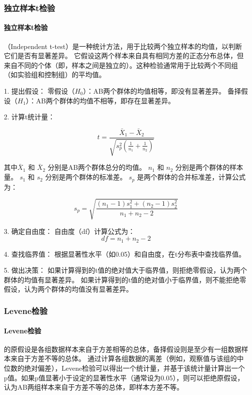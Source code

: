\documentclass[withoutpreface,bwprint]{cumcmthesis} %
\begin{document}
\subsubsection{独立样本t检验}

\paragraph*{独立样本t检验}（Independent t-test）是一种统计方法，用于比较两个独立样本的均值，以判断它们是否有显著差异。
它假设这两个样本来自具有相同方差的正态分布总体，但来自不同的个体（即，样本之间是独立的）。这种检验通常用于比较两个不同组（如实验组和控制组）的平均值。

1. 提出假设：
   零假设（\( H_0 \)）：AB两个群体的均值相等，即没有显著差异。
   备择假设（\( H_1 \)）：AB两个群体的均值不相等，即存在显著差异。

2. 计算t统计量：

\begin{equation}
    t = \frac{\bar{X}_1 - \bar{X}_2}{\sqrt{s_p^2 (\frac{1}{n_1} + \frac{1}{n_2})}}
    \label{eq:t}
\end{equation}

     其中\( \bar{X}_1 \) 和 \( \bar{X}_2 \) 分别是AB两个群体总分的均值。
     \( n_1 \) 和 \( n_2 \) 分别是两个群体的样本量。
     \( s_1 \) 和 \( s_2 \) 分别是两个群体的标准差。
     \( s_p \) 是两个群体的合并标准差，计算公式为：

\begin{equation}
s_p = \sqrt{\frac{(n_1 - 1)s_1^2 + (n_2 - 1)s_2^2}{n_1 + n_2 - 2}}  
    \label{eq:合并标准差}
\end{equation}
     

3. 确定自由度：
   自由度（df）计算公式为：\[ df = n_1 + n_2 - 2 \]

4. 查找临界值：
   根据显著性水平（如0.05）和自由度，在t分布表中查找临界值。

5. 做出决策：
   如果计算得到的t值的绝对值大于临界值，则拒绝零假设，认为两个群体的均值有显著差异。
   如果计算得到的t值的绝对值小于临界值，则不能拒绝零假设，认为两个群体的均值没有显著差异。



\subsubsection{Levene检验}

\paragraph*{Levene检验}的原假设是各组数据样本来自于方差相等的总体，备择假设则是至少有一组数据样本来自于方差不等的总体。
通过计算各组数据的离差（例如，观察值与该组的中位数的绝对偏差），Levene检验可以得出一个统计量，并基于该统计量计算出一个p值。如果p值显著小于设定的显著性水平（通常设为0.05），则可以拒绝原假设，认为AB两组样本来自于方差不等的总体，即样本方差不等。
\end{document}
